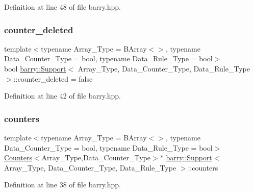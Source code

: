 Definition at line 48 of file barry.\+hpp.

\mbox{\label{classbarry_1_1_support_a5de08029a7262ba86df728c8b8427999}} 
\subsubsection{\texorpdfstring{counter\+\_\+deleted}{counter\_deleted}}
{\footnotesize\ttfamily template$<$typename Array\+\_\+\+Type  = B\+Array$<$$>$, typename Data\+\_\+\+Counter\+\_\+\+Type  = bool, typename Data\+\_\+\+Rule\+\_\+\+Type  = bool$>$ \\
bool \hyperlink{classbarry_1_1_support}{barry\+::\+Support}$<$ Array\+\_\+\+Type, Data\+\_\+\+Counter\+\_\+\+Type, Data\+\_\+\+Rule\+\_\+\+Type $>$\+::counter\+\_\+deleted = false}



Definition at line 42 of file barry.\+hpp.

\mbox{\label{classbarry_1_1_support_a4f02bd235d4c7eccfe167edbc7ebe596}} 
\subsubsection{\texorpdfstring{counters}{counters}}
{\footnotesize\ttfamily template$<$typename Array\+\_\+\+Type  = B\+Array$<$$>$, typename Data\+\_\+\+Counter\+\_\+\+Type  = bool, typename Data\+\_\+\+Rule\+\_\+\+Type  = bool$>$ \\
\hyperlink{classbarry_1_1_counters}{Counters}$<$Array\+\_\+\+Type,Data\+\_\+\+Counter\+\_\+\+Type$>$$\ast$ \hyperlink{classbarry_1_1_support}{barry\+::\+Support}$<$ Array\+\_\+\+Type, Data\+\_\+\+Counter\+\_\+\+Type, Data\+\_\+\+Rule\+\_\+\+Type $>$\+::counters}



Definition at line 38 of file barry.\+hpp.

\mbox{\label{classbarry_1_1_support_aa69d5a47e5ee039b19f42edacd5453d4}} 
